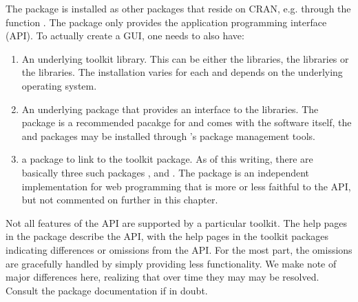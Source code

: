 The  package is installed as other \R\/
packages that reside on CRAN, e.g. through the function
. The  package only provides
the application programming interface (API). To actually create a GUI, one
needs to also have: 
\begin{enumerate}
\item An underlying toolkit library. This can be either the \Tk\/
  libraries, the \GTK\/ libraries or the \Qt\/ libraries. The
  installation varies for each and depends on the underlying operating system.
  
\item An underlying \R\/ package that provides an interface to the
  libraries. The  package is a recommended pacakge for \R\/
  and comes with the \R\/ software itself, the  and
   packages may be installed through \R's package
  management tools.
  
\item a  package to link  to the \R\/ toolkit
  package. As of this writing, there are basically three such packages
  ,  and .  The
   package is an independent implementation for web
  programming that is more or less faithful to the API, but not
  commented on further in this chapter.
\end{enumerate}

Not all features of the API are supported by a particular toolkit.
The help pages in the  package describe the API, with
the help pages in the toolkit packages indicating differences or
omissions from the API. For the most part, the omissions are
gracefully handled by simply providing less functionality. We make
note of major differences here, realizing that over time they may may
be resolved. Consult the package documentation if in doubt.




